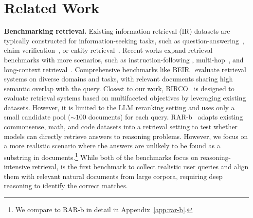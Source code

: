 \section{Related Work}
\textbf{Benchmarking retrieval.}
Existing information retrieval (IR) datasets are typically constructed for information-seeking tasks, such as question-answering~\citep{voorhees2000building_trec,craswell2020overview,kwiatkowski2019natural,chen-etal-2017-reading,maia201818}, claim verification~\citep{thorne2018fever,diggelmann2020climate,wadden2020fact}, or entity retrieval~\citep{hasibi2017dbpedia,petroni-etal-2021-kilt}. 
Recent works expand retrieval benchmarks with more scenarios, such as instruction-following \citep{su-etal-2023-one,weller2024followir,oh2024instructir,li2024url}, multi-hop~\citep{yang2018hotpotqa}, and long-context retrieval~\citep{saad2024benchmarking,zhu2024longembed}. 
Comprehensive benchmarks like BEIR~\citep{thakur2021beir} evaluate retrieval systems on diverse domains and tasks, with relevant documents sharing high semantic overlap with the query. 
Closest to our work, BIRCO~\citep{wang2024birco} is designed to evaluate retrieval systems based on multifaceted objectives by leveraging existing datasets. 
However, it is limited to the LLM reranking setting and uses only a small candidate pool ($\sim 100$ documents) for each query. 
RAR-b~\citep{xiao2024rarb} adapts existing commonsense, math, and code datasets into a retrieval setting to test whether models can directly retrieve answers to reasoning problems. 
However, we focus on a more realistic scenario where the answers are unlikely to be found as a substring in documents.\footnote{We compare to RAR-b in detail in Appendix~\ref{app:rar-b}.}
While both of the benchmarks focus on reasoning-intensive retrieval, \ours is the first benchmark to collect realistic user queries and align them with relevant natural documents from large corpora, requiring deep reasoning to identify the correct matches.


